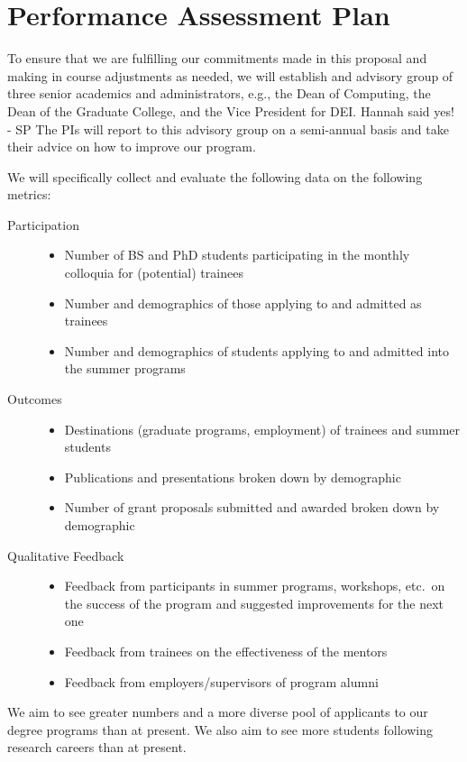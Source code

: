 \documentclass[11pt]{NSFamsart}
\begin{document}
{%
\section{Performance Assessment Plan  }
 
To ensure that we are fulfilling our commitments made in this proposal and making in course adjustments as needed, we will establish and advisory group of three senior academics and administrators, e.g., the Dean of Computing, the Dean of the Graduate College, and the Vice President for DEI. 
{\color{magenta}Hannah said yes! - SP}
The PIs will report to this advisory group on a semi-annual basis and take their advice on how to improve our program.

We will specifically collect and evaluate the following data on the following metrics:

\begin{description}
	\item[Participation] \phantom{a}
	\begin{itemize}
		\item Number of BS and PhD students participating in the monthly colloquia for (potential) trainees
		\item Number and demographics of those applying to and admitted as trainees
		\item Number and demographics of students applying to and admitted into the summer programs
	\end{itemize}
	\item[Outcomes] \phantom{a}
	\begin{itemize}
		\item Destinations (graduate programs, employment) of trainees and summer students
		\item Publications and presentations broken down by demographic
		\item Number of grant proposals submitted and awarded broken down by demographic
	\end{itemize}
	\item[Qualitative Feedback] \phantom{a}
\begin{itemize}
\item Feedback from participants in summer programs, workshops, etc.\ on the success of the program and suggested improvements for the next one
\item Feedback from trainees on the effectiveness of the mentors
\item Feedback from employers/supervisors of program alumni
\end{itemize}
\end{description}
We aim to see greater numbers and a more diverse pool of  applicants to our degree programs than at present.  We also aim to see more students following research careers than at present.  
 


}
\end{document}
